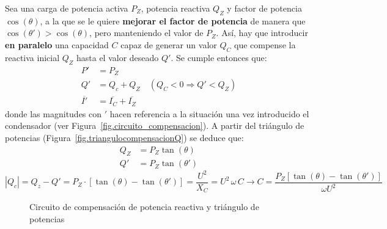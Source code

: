 \documentclass[11pt]{book} %
\begin{document}
	Sea una carga de potencia activa $P_Z$, potencia reactiva $Q_Z$ y factor de potencia $\cos(\theta)$, a la que se le quiere \textbf{mejorar el factor de potencia} de manera que $\cos (\theta') > \cos (\theta)$, pero manteniendo el valor de $P_Z$. Así, hay que introducir \textbf{en paralelo} una capacidad $C$ capaz de generar un valor $Q_C$ que compense la reactiva inicial $Q_Z$ hasta el valor deseado $Q'$. Se cumple entonces que: 
	\begin{align*}
		P' &= P_Z\\
		Q' &= Q_c + Q_Z \quad (Q_C<0\Rightarrow Q' < Q_Z)\\
		\overline{I'} &= \overline{I_C} + \overline{I_Z}
	\end{align*}
	donde las magnitudes con $'$ hacen referencia a la situación una vez introducido el condensador (ver Figura~\ref{fig.circuito_compensacion}). A partir del triángulo de potencias (Figura~\ref{fig.triangulocompensacionQ}) se deduce que:
	\begin{align*}
		Q_Z &= P_Z \tan (\theta)\\
		Q'&= P_Z \tan (\theta')
	\end{align*}
	\begin{equation}\label{eq.compensacion_Q_mono}
		|Q_c| = Q_z - Q' = P_Z\cdot \left[\tan (\theta) - \tan (\theta')\right]=\dfrac{U^2}{X_C}={U^2\,\omega\,C}\rightarrow \boxed{C=\frac{P_Z \left[\tan (\theta) - \tan (\theta')\right]}{\omega U^2}}
	\end{equation}
	
	
	\begin{figure}
		\centering
		\hfil
		\caption{Circuito de compensación de potencia reactiva y triángulo de potencias}
		\label{fig.circuitocompensacionreactiva}
	\end{figure}
	
\end{document}
